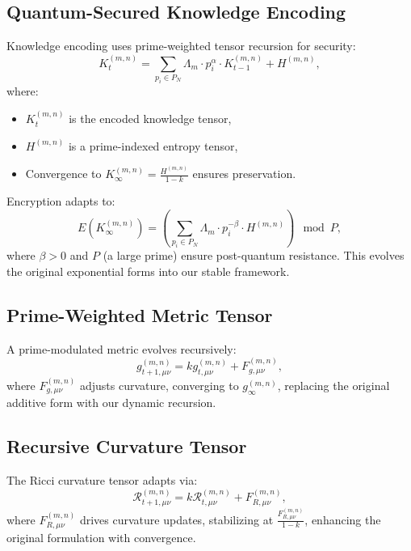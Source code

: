 \documentclass{article}
\theoremstyle{plain}
\begin{document}
\subsection{Quantum-Secured Knowledge Encoding}
Knowledge encoding uses prime-weighted tensor recursion for security:
\begin{equation}
    K_t^{(m,n)} = \sum_{p_i \in P_N} \Lambda_m \cdot p_i^\alpha \cdot K_{t-1}^{(m,n)} + H^{(m,n)},
\end{equation}
where:
\begin{itemize}
    \item \( K_t^{(m,n)} \) is the encoded knowledge tensor,
    \item \( H^{(m,n)} \) is a prime-indexed entropy tensor,
    \item Convergence to \( K_\infty^{(m,n)} = \frac{H^{(m,n)}}{1 - k} \) ensures preservation.
\end{itemize}
Encryption adapts to:
\begin{equation}
    E(K_\infty^{(m,n)}) = \left( \sum_{p_i \in P_N} \Lambda_m \cdot p_i^{-\beta} \cdot H^{(m,n)} \right) \mod P,
\end{equation}
where \( \beta > 0 \) and \( P \) (a large prime) ensure post-quantum resistance. This evolves the original exponential forms into our stable framework.

\subsection{Prime-Weighted Metric Tensor}
A prime-modulated metric evolves recursively:
\begin{equation}
    g_{t+1,\mu\nu}^{(m,n)} = k g_{t,\mu\nu}^{(m,n)} + F_{g,\mu\nu}^{(m,n)},
\end{equation}
where \( F_{g,\mu\nu}^{(m,n)} \) adjusts curvature, converging to \( g_\infty^{(m,n)} \), replacing the original additive form with our dynamic recursion.

\subsection{Recursive Curvature Tensor}
The Ricci curvature tensor adapts via:
\begin{equation}
    \mathcal{R}_{t+1,\mu\nu}^{(m,n)} = k \mathcal{R}_{t,\mu\nu}^{(m,n)} + F_{R,\mu\nu}^{(m,n)},
\end{equation}
where \( F_{R,\mu\nu}^{(m,n)} \) drives curvature updates, stabilizing at \( \frac{F_{R,\mu\nu}^{(m,n)}}{1 - k} \), enhancing the original formulation with convergence.
\end{document}
